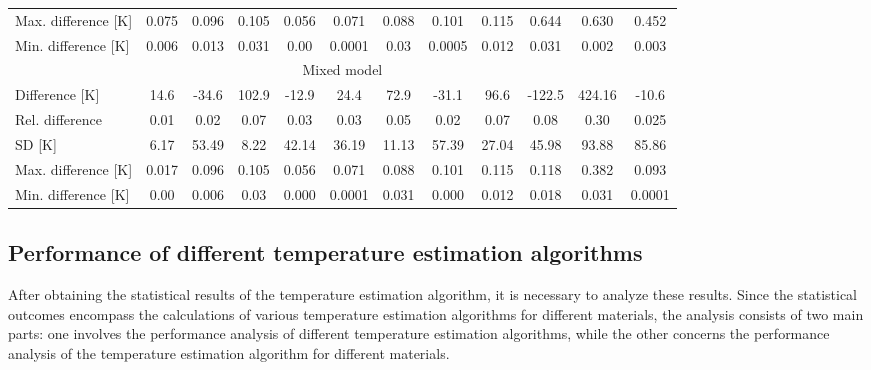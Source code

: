 \begin{table}
\begin{tabular}{lccccccccccc}
        Max. difference {[}K{]} & 0.075                          & 0.096                         & 0.105   & 0.056   & 0.071   & 0.088   & 0.101   & 0.115   & 0.644   & 0.630   & 0.452   \\
        Min. difference {[}K{]} & 0.006                          & 0.013                         & 0.031   & 0.00    & 0.0001  & 0.03    & 0.0005  & 0.012   & 0.031   & 0.002   & 0.003   \\ \hline
        \multicolumn{12}{c}{Mixed model}                                                                                                                                                   \\ \hline
        Difference {[}K{]}      & 14.6                           & -34.6                         & 102.9   & -12.9   & 24.4    & 72.9    & -31.1   & 96.6    & -122.5  & 424.16  & -10.6    \\
        Rel. difference         & 0.01                           & 0.02                          & 0.07    & 0.03    & 0.03    & 0.05    & 0.02    & 0.07    & 0.08    & 0.30    & 0.025    \\
        SD {[}K{]}              & 6.17                           & 53.49                         & 8.22    & 42.14   & 36.19   & 11.13   & 57.39   & 27.04   & 45.98   & 93.88   & 85.86  \\
        Max. difference {[}K{]} & 0.017                          & 0.096                         & 0.105   & 0.056   & 0.071   & 0.088   & 0.101   & 0.115   & 0.118   & 0.382   & 0.093   \\
        Min. difference {[}K{]} & 0.00                           & 0.006                         & 0.03    & 0.000   & 0.0001  & 0.031   & 0.000   & 0.012   & 0.018   & 0.031   & 0.0001  
    \end{tabular}
\end{table}


\subsection{Performance of different temperature estimation algorithms}
After obtaining the statistical results of the temperature estimation algorithm, 
it is necessary to analyze these results. Since the statistical outcomes 
encompass the calculations of various temperature estimation algorithms 
for different materials, the analysis consists of two main parts: one involves 
the performance analysis of different temperature estimation algorithms, 
while the other concerns the performance analysis of the temperature estimation 
algorithm for different materials.


